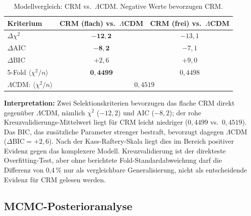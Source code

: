 \documentclass[aps,prd,twocolumn,superscriptaddress,nofootinbib]{revtex4-2}
\begin{document}
\begin{table}[htbp]
\centering
\caption{Modellvergleich: CRM vs.\ $\Lambda$CDM. Negative Werte bevorzugen CRM.}
\label{tab:comparison}
\begin{tabular}{lcc}
\toprule
\textbf{Kriterium} & CRM (flach) vs.\ $\Lambda$CDM & CRM (frei) vs.\ $\Lambda$CDM \\
\midrule
$\Delta\chi^2$ & $\mathbf{-12{,}2}$ & $-13{,}1$ \\
$\Delta$AIC & $\mathbf{-8{,}2}$ & $-7{,}1$ \\
$\Delta$BIC & $+2{,}6$ & $+9{,}0$ \\
\midrule
5-Fold $\langle\chi^2/n\rangle$ & $\mathbf{0{,}4499}$ & $0{,}4498$ \\
$\Lambda$CDM: $\langle\chi^2/n\rangle$ & \multicolumn{2}{c}{$0{,}4519$} \\
\bottomrule
\end{tabular}
\end{table}

\textbf{Interpretation:} Zwei Selektionskriterien bevorzugen das flache CRM direkt gegenüber $\Lambda$CDM, nämlich $\chi^2$ ($-12{,}2$) und AIC ($-8{,}2$); der rohe Kreuzvalidierungs-Mittelwert liegt für CRM leicht niedriger ($0{,}4499$ vs.\ $0{,}4519$). Das BIC, das zusätzliche Parameter strenger bestraft, bevorzugt dagegen $\Lambda$CDM ($\Delta\mathrm{BIC} = +2{,}6$). Nach der Kass-Raftery-Skala \cite{KassRaftery1995} liegt dies im Bereich positiver Evidenz gegen das komplexere Modell. Kreuzvalidierung ist der direkteste Overfitting-Test, aber ohne berichtete Fold-Standardabweichung darf die Differenz von 0{,}4\,\% nur als vergleichbare Generalisierung, nicht als entscheidende Evidenz für CRM gelesen werden.

\subsection{MCMC-Posterioranalyse}
\label{subsec:mcmc}
\end{document}
